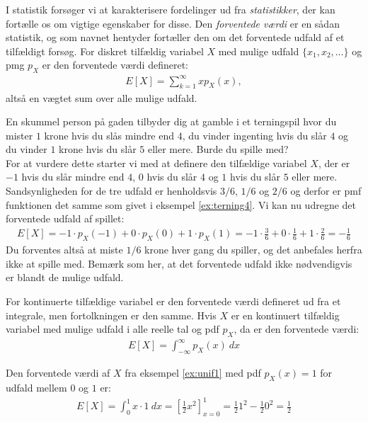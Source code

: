 I statistik forsøger vi at karakterisere fordelinger ud fra \emph{statistikker}, der kan fortælle os om vigtige egenskaber for disse. Den \emph{forventede værdi} er en sådan statistik, og som navnet hentyder fortæller den om det forventede udfald af et tilfældigt forsøg. For diskret tilfældig variabel  $X$ med mulige udfald $\{x_1,x_2,\dots\}$ og pmg $p_X$ er den forventede værdi defineret:
\begin{align*}
E[X] = \sum_{k=1}^{\infty} xp_X(x),
\end{align*}
altså en vægtet sum over alle mulige udfald.
\begin{example} \label{ex:game}
En skummel person på gaden tilbyder dig at gamble i et terningspil hvor du mister $1$ krone hvis du slås mindre end $4$, du vinder ingenting hvis du slår $4$ og du vinder $1$ krone hvis du slår $5$ eller mere. Burde du spille med? \\
For at vurdere dette starter vi med at definere den tilfældige variabel $X$, der er $-1$ hvis du slår mindre end $4$, $0$ hvis du slår $4$ og $1$ hvis du slår $5$ eller mere. Sandsynligheden for de tre udfald er henholdsvis $3/6$, $1/6$ og $2/6$ og derfor er pmf funktionen det samme som givet i eksempel \ref{ex:terning4}. Vi kan nu udregne det forventede udfald af spillet:
\begin{align*}
E[X] = -1\cdot p_X(-1) + 0\cdot p_X(0) + 1\cdot p_X(1) = -1\cdot \frac{3}{6} + 0\cdot\frac{1}{6} + 1\cdot \frac{2}{6} = -\frac{1}{6}
\end{align*}
Du forventes altså at miste $1/6$ krone hver gang du spiller, og det anbefales herfra ikke at spille med. Bemærk som her, at det forventede udfald ikke nødvendigvis er blandt de mulige udfald. 
\end{example}
For kontinuerte tilfældige variabel er den forventede værdi defineret ud fra et integrale, men fortolkningen er den samme. Hvis $X$ er en kontinuert tilfældig variabel med mulige udfald i alle reelle tal og pdf $p_X$, da er den forventede værdi:
\begin{align*}
E[X] = \int_{-\infty}^{\infty} p_X(x) \ dx
\end{align*}
\begin{example}
Den forventede værdi af $X$ fra eksempel \ref{ex:unif1} med pdf $p_X(x) = 1$ for udfald mellem $0$ og $1$ er:
\begin{align*}
E[X] = \int_0^1 x\cdot 1 \ dx = \left[\frac{1}{2}x^2 \right]_{x=0}^1 = \frac{1}{2}1^2 - \frac{1}{2}0^2 = \frac{1}{2}
\end{align*}
\end{example}
